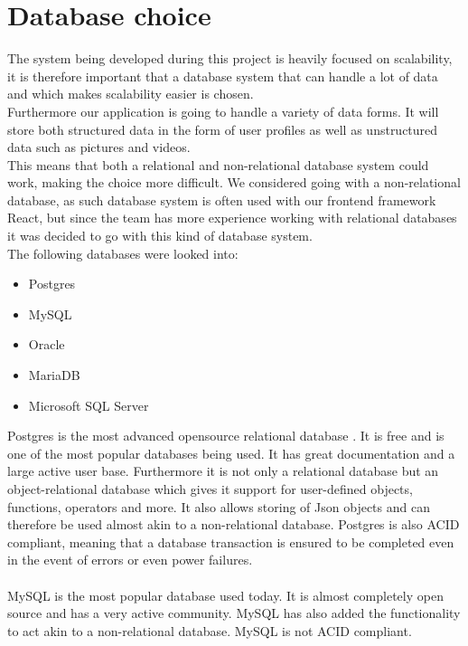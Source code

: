 \section{Database choice}
The system being developed during this project is heavily focused on scalability, it is therefore important that a database system that can handle a lot of data and which makes scalability easier is chosen.
\\
Furthermore our application is going to handle a variety of data forms. It will store both structured data in the form of user profiles as well as unstructured data such as pictures and videos.
\\
This means that both a relational and non-relational database system could work, making the choice more difficult.
We considered going with a non-relational database, as such database system is often used with our frontend framework React, but since the team has more experience working with relational databases it was decided to go with this kind of database system.
\\
The following databases were looked into:
\begin{itemize}
    \item Postgres
    \item MySQL
    \item Oracle
    \item MariaDB
    \item Microsoft SQL Server
\end{itemize}
Postgres is the most advanced opensource relational database \cite{Postgres}.
It is free and is one of the most popular databases being used\cite{databasePopularity}.
It has great documentation and a large active user base.
Furthermore it is not only a relational database but an object-relational database which gives it support for user-defined objects, functions, operators and more.
It also allows storing of Json objects and can therefore be used almost akin to a non-relational database.
Postgres is also ACID compliant, meaning that a database transaction is ensured to be completed even in the event of errors or even power failures.
\\
\\
MySQL is the most popular database used today\cite{databasePopularity}.
It is almost completely open source and has a very active community\cite{MySQL}.
MySQL has also added the functionality to act akin to a non-relational database.
MySQL is not ACID compliant.
\\
\\
